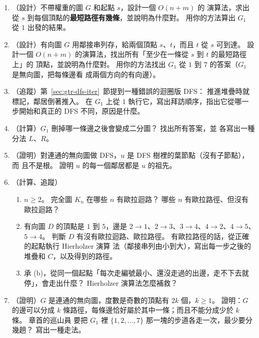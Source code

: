 \begin{enumerate}
\item \label{q:gtr-count-paths}（設計）不帶權重的圖 $G$ 和起點 $s$，設計一個 $O(n + m)$ 的
演算法，求出從 $s$ 到每個頂點的\textbf{最短路徑有幾條}，並說明為什麼對。 用你的方法算出
$G_1$ 從 $1$ 出發的結果。

\item \label{q:gtr-on-path}（設計）有向圖 $G$ 用鄰接串列存，給兩個頂點 $s$、$t$，而且 $t$ 從 $s$
可到達。 設計一個 $O(n + m)$ 的演算法，找出所有「至少在一條從 $s$ 到 $t$ 的最短路徑上」的
頂點，並說明為什麼對。 用你的方法找出 $G_1$ 從 $1$ 到 $7$ 的答案（$G_1$ 是無向圖，把每條邊看
成兩個方向的有向邊）。

\item \label{q:gtr-wrong-dfs}（追蹤）第~\ref{sec:gtr-dfs-iter}~節提到一種錯誤的迴圈版 DFS：
推進堆疊時就標記，鄰居倒著推入。 在 $G_1$ 上從 $1$ 執行它，寫出拜訪順序，指出它從哪一
步開始和真正的 DFS 不同，原因是什麼。

\item \label{q:gtr-make-bip}（計算）$G_1$ 刪掉哪一條邊之後會變成二分圖？ 找出所有答案，並
各寫出一種分法 $L$、$R$。

\item \label{q:gtr-leaf}（證明）對連通的無向圖做 DFS，$u$ 是 DFS 樹裡的葉節點（沒有子節點），而
且不是根。 證明 $u$ 的每一個鄰居都是 $u$ 的祖先。

\item \label{q:gtr-euler-kn}（計算、追蹤）
\begin{enumerate}
\item $n \ge 2$。 完全圖 $K_n$ 在哪些 $n$ 有歐拉迴路？ 哪些 $n$ 有歐拉路徑、但沒有歐拉迴路？
\item 有向圖 $D$ 的頂點是 $1$ 到 $5$，邊是 $2 \to 1$、$2 \to 3$、$3 \to 4$、$4 \to 2$、$4 \to 5$、
$5 \to 4$。 判斷 $D$ 有沒有歐拉迴路、歐拉路徑。 有歐拉路徑的話，從正確的起點執行 Hierholzer 演算
法（鄰接串列由小到大），寫出每一步之後的堆疊和 $C$，以及得到的路徑。
\item 承 (b)，從同一個起點「每次走編號最小、還沒走過的出邊，走不下去就停」，會走出什麼？
Hierholzer 演算法怎麼補救？
\end{enumerate}

\item \label{q:gtr-euler-cover}（證明）$G$ 是連通的無向圖，度數是奇數的頂點有 $2k$ 個，$k \ge 1$。
證明：$G$ 的邊可以分成 $k$ 條路徑，每條邊恰好屬於其中一條；而且不能分成少於 $k$ 條。 章首的巡山員
要把 $G_1$ 裡 $\{1, 2, \ldots, 7\}$ 那一塊的步道各走一次，最少要分幾趟？ 寫出一種走法。
\end{enumerate}

